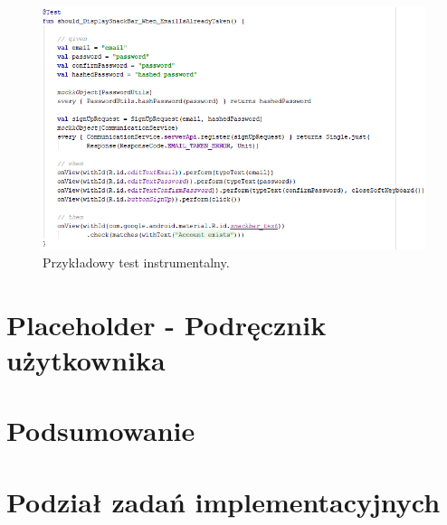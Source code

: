 \documentclass[10pt,twoside,a4paper]{report}
\begin{document}
\begin{figure}[h]
\centering
\includegraphics[width=\linewidth]{instrumentationTest}
\caption{Przykładowy test instrumentalny.}
\label{fig:instrumentationTest}
\end{figure}


\chapter{Placeholder - Podręcznik użytkownika}

\chapter{Podsumowanie}

\chapter*{Podział zadań implementacyjnych}

\end{document}
